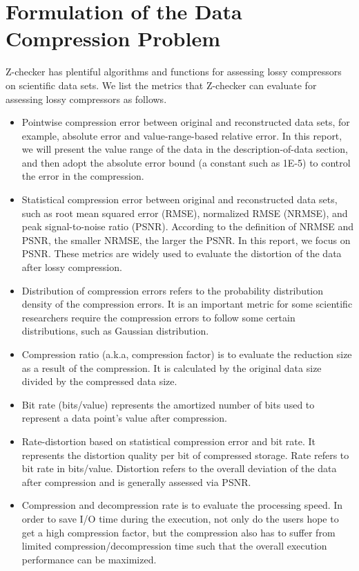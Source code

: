 \section{Formulation of the Data Compression Problem}
Z-checker has plentiful algorithms and functions for assessing lossy compressors on scientific data sets.
We list the metrics that Z-checker can evaluate for assessing lossy compressors as follows.
\begin{itemize}
\item Pointwise compression error between original and reconstructed data sets, for example, absolute error and value-range-based relative error. In this report, we will present the value range of the data in the description-of-data section, and then adopt the absolute error bound (a constant such as 1E-5) to control the error in the compression.
\item Statistical compression error between original and reconstructed data sets, such as root mean squared error (RMSE), normalized RMSE (NRMSE), and peak signal-to-noise ratio (PSNR). According to the definition of NRMSE and PSNR, the smaller NRMSE, the larger the PSNR. In this report, we focus on PSNR. 
These metrics are widely used to evaluate the distortion of the data after lossy compression.
\item Distribution of compression errors refers to the probability distribution density of the compression errors.
It is an important metric for some scientific researchers require the compression errors to follow some certain distributions, such as Gaussian distribution.
\item Compression ratio (a.k.a, compression factor) is to evaluate the reduction size as a result of the compression. It is calculated by the original data size divided by the compressed data size.
\item Bit rate (bits/value) represents the amortized number of bits used to represent a data point's value after compression.
\item Rate-distortion based on statistical compression error and bit rate. It represents the distortion quality per bit of compressed storage. 
Rate refers to bit rate in bits/value. Distortion refers to the overall deviation of the data after compression and is generally assessed via PSNR.
\item Compression and decompression rate is to evaluate the processing speed.
In order to save I/O time during the execution, not only do the users hope to get a high compression factor, but the compression also has to suffer from limited compression/decompression time such that the overall execution performance can be maximized.

\end{itemize}
